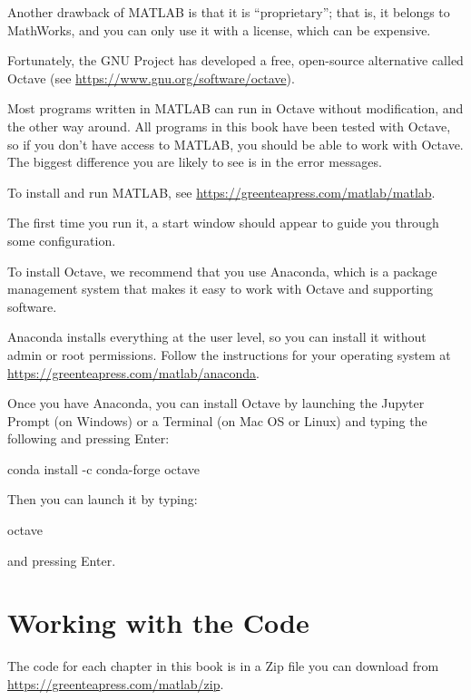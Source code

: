 Another drawback of MATLAB is that it is ``proprietary''; that is, it belongs to MathWorks, and you can only use it with a license, which can be expensive.

Fortunately, the GNU Project has developed a free, open-source alternative called Octave (see \url{https://www.gnu.org/software/octave}).  

Most programs written in MATLAB can run in Octave without modification, and the other way around.  All programs in this book have been tested with Octave, so if you don't have access to MATLAB, you should be able to work with Octave.  The biggest difference you are likely to see is in the error messages.

To install and run MATLAB, see \url{https://greenteapress.com/matlab/matlab}.

The first time you run it, a start window should appear to guide you through some configuration.

To install Octave, we recommend that you use Anaconda, which is a package management system that makes it easy to work with Octave and supporting software.

Anaconda installs everything at the user level, so you can install it without admin or root permissions.  Follow the instructions for your operating system at \url{https://greenteapress.com/matlab/anaconda}.

Once you have Anaconda, you can install Octave by launching the Jupyter Prompt (on Windows) or a Terminal (on Mac OS or Linux) and typing the following and pressing Enter:

\begin{code}
conda install -c conda-forge octave
\end{code}

Then you can launch it by typing:

\begin{code}
octave
\end{code}

and pressing Enter.

\section{Working with the Code}



The code for each chapter in this book is in a Zip file you can download from \url{https://greenteapress.com/matlab/zip}.

